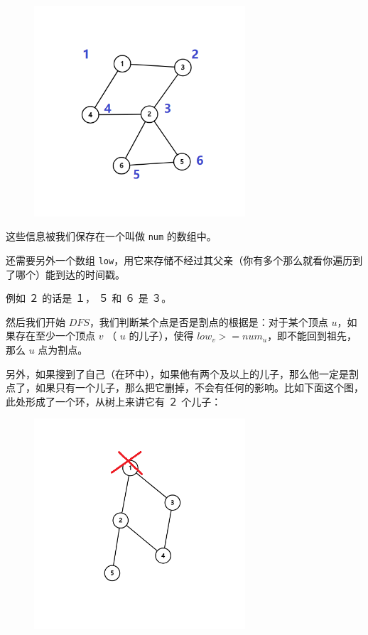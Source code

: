 \begin{figure}[htbp]
\centering
\includegraphics[width=0.7\textwidth]{docs/graph/images/bridge2.png} 

\end{figure}

这些信息被我们保存在一个叫做 \texttt{num} 的数组中。

还需要另外一个数组 \texttt{low}，用它来存储不经过其父亲（你有多个那么就看你遍历到了哪个）能到达的时间戳。

例如 ２ 的话是 １， ５ 和 ６ 是 ３。

然后我们开始 $DFS$，我们判断某个点是否是割点的根据是：对于某个顶点 $u$，如果存在至少一个顶点 $v$ （ $u$ 的儿子），使得 $low_v>=num_u$，即不能回到祖先，那么 $u$ 点为割点。

另外，如果搜到了自己（在环中），如果他有两个及以上的儿子，那么他一定是割点了，如果只有一个儿子，那么把它删掉，不会有任何的影响。比如下面这个图，此处形成了一个环，从树上来讲它有 ２ 个儿子：

\begin{figure}[htbp]
\centering
\includegraphics[width=0.7\textwidth]{docs/graph/images/bridge3.png} 

\end{figure} 

